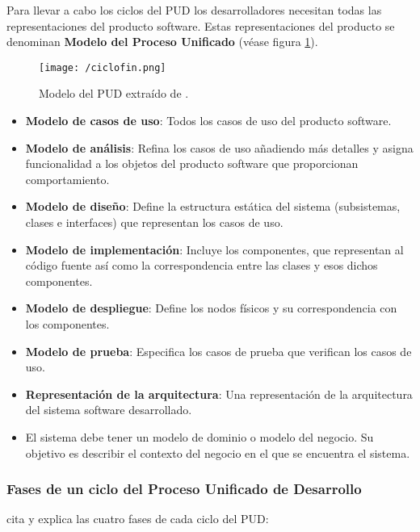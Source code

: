 Para llevar a cabo los ciclos del \acs{PUD} los desarrolladores necesitan todas las
representaciones del producto software. Estas representaciones del producto se
denominan \textbf{Modelo del Proceso Unificado} (véase figura \ref{fig:ciclo-fin}).

\begin{figure}[!h]
  \begin{center}
    \texttt{[image: /ciclofin.png]} 
    \caption{Modelo del \acs{PUD} extraído de \cite{rumbaugh_jacobson_pud}.}
    \label{fig:ciclo-fin}
  \end{center}
\end{figure}


\begin{itemize}
\item \textbf{Modelo de casos de uso}: Todos los casos de uso del producto
  software. 
\item \textbf{Modelo de análisis}: Refina los casos de uso añadiendo más
  detalles y asigna funcionalidad a los objetos del producto software que
  proporcionan comportamiento.
\item \textbf{Modelo de diseño}: Define la estructura estática del sistema
  (subsistemas, clases e interfaces) que representan los casos de uso. 
\item \textbf{Modelo de implementación}: Incluye los componentes, que
  representan al código fuente así como la correspondencia entre las clases y
  esos dichos componentes.
\item \textbf{Modelo de despliegue}: Define los nodos físicos y su
  correspondencia con los componentes.
\item \textbf{Modelo de prueba}: Especifica los casos de prueba que verifican
  los casos de uso.
\item \textbf{Representación de la arquitectura}: Una representación de la
  arquitectura del sistema software desarrollado. 
\item El sistema debe tener un modelo de dominio o modelo del negocio. Su
  objetivo es describir el contexto del negocio en el que se encuentra el
  sistema. 
\end{itemize}


\subsubsection{Fases de un ciclo del Proceso Unificado de Desarrollo}

\cite{rumbaugh_jacobson_pud} cita y explica las cuatro fases de cada ciclo del \acs{PUD}:

